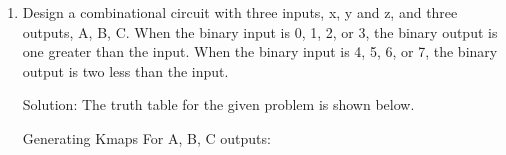 \documentclass[table]{article}
\begin{document}
\begin{enumerate}
    \item Design a combinational circuit with three inputs, x, y and z, and three outputs, A, B, C.
    When the binary input is 0, 1, 2, or 3, the binary output is one greater than the input. When
    the binary input is 4, 5, 6, or 7, the binary output is two less than the input.

    Solution: The truth table for the given problem is shown below. \\

    
\begin{table}[H]
    \centering
    \caption{Truth Table for the given problem}
    \label{tab:enhanced-table}
    \end{table}



Generating Kmaps For A, B, C outputs:



\end{enumerate}
\end{document}
